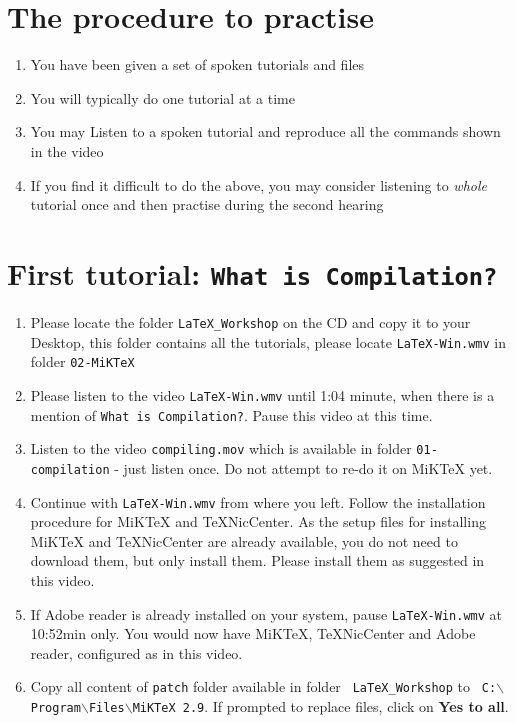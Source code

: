\documentclass[11pt]{article}
\newenvironment{enumcpt}{\begin{enumerate} \topsep 0pt \partopsep 0pt 
                        \parsep 0pt
                        \itemsep 0pt \leftmargin -1in \rightmargin 0pt
                        }{\end{enumerate}}
\begin{document}
\begin{multicols}{2}

\section{The procedure to practise}
\begin{enumcpt}
\item You have been given a set of spoken tutorials and files
\item You will typically do one tutorial at a time
\item You may Listen to a spoken tutorial and reproduce all the
  commands shown in the video
\item If you find it difficult to do the above, you may consider
  listening to \emph{whole} tutorial once and then practise during
  the second hearing
\end{enumcpt}

\section{First tutorial: {\tt What is
    Compilation?}}
\begin{enumerate}
\item Please locate the folder {\tt LaTeX\_Workshop} on the CD and
  copy it to your Desktop, this folder contains all the tutorials,
  please locate {\tt LaTeX-Win.wmv} in folder {\tt 02-MiKTeX}
\item Please listen to the video {\tt LaTeX-Win.wmv} until 1:04
  minute, when there is a mention of {\tt What is Compilation?}.
  Pause this video at this time.
\item Listen to the video {\tt compiling.mov} which is available in
  folder {\tt 01-compilation} - just listen once.  Do not attempt to
  re-do it on MiKTeX yet.
\item Continue with {\tt LaTeX-Win.wmv} from where you left.  Follow
  the installation procedure for MiKTeX and TeXNicCenter.  As the
  setup files for installing MiKTeX and TeXNicCenter are already
  available, you do not need to download them, but only install them.
  Please install them as suggested in this video.
\item If Adobe reader is already installed on your system, pause
  {\tt LaTeX-Win.wmv} at 10:52min only.  You would now have MiKTeX,
  TeXNicCenter and Adobe reader, configured as in this video.  
\item Copy all content of {\tt patch} folder available in folder {\tt
  LaTeX\_Workshop} to {\tt
  C:$\backslash$Program$\backslash$Files$\backslash$MiKTeX 2.9}. If
  prompted to replace files, click on {\bf Yes to all}.


\end{enumerate}
\end{multicols}
\end{document}
